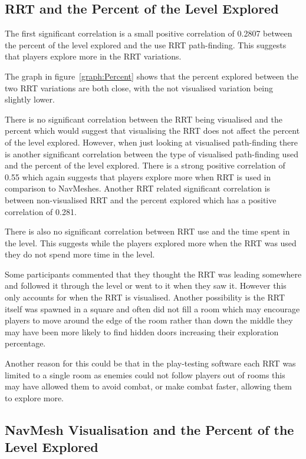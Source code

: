 \documentclass[journal]{IEEEtran}
\begin{document}
	\subsection{RRT and the Percent of the Level Explored} \label{RRTExplore}
	The first significant correlation is a small positive correlation of 0.2807 between the percent of the level explored and the use RRT path-finding. This suggests that players explore more in the RRT variations.    
	
	
	The graph in figure~\ref{graph:Percent} shows that the percent explored between the two RRT variations are both close, with the not visualised variation being slightly lower. 
	
	There is no significant correlation between the RRT being visualised and the percent which would suggest that visualising the RRT does not affect the percent of the level explored. However, when just looking at visualised path-finding there is another significant correlation between the type of visualised path-finding used and the percent of the level explored. There is a strong positive correlation of 0.55 which again suggests that players explore more when RRT is used in comparison to NavMeshes. Another RRT related significant correlation is between non-visualised RRT and the percent explored which has a positive correlation of 0.281.  
	
	There is also no significant correlation between RRT use and the time spent in the level. This suggests while the players explored more when the RRT was used they do not spend more time in the level.  
	
	Some participants commented that they thought the RRT was leading somewhere and followed it through the level or went to it when they saw it.  However this only accounts for when the RRT is visualised. Another possibility is the RRT itself was spawned in a square and often did not fill a room which may encourage players to move around the edge of the room rather than down the middle they may have been more likely to find hidden doors increasing their exploration percentage.
	
	Another reason for this could be that in the play-testing software each RRT was limited to a single room as enemies could not follow players out of rooms this may have allowed them to avoid combat, or make combat faster, allowing them to explore more. 
	
	
	\subsection{NavMesh Visualisation and the Percent of the Level Explored}
	
\end{document}
